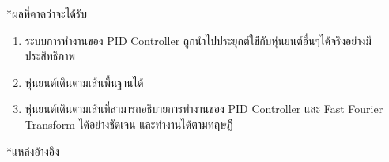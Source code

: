 \documentclass[14pt, fleqn, a4paper]{extarticle}
\makeatletter
\renewcommand\section{%
  \@ifstar{\flatsection}{\@section}%
}
\newcommand{\flatsection}[1]{%
   \par\medskip\noindent
   {\bfseries #1\par}
}
\makeatother
\begin{document}
\section*{ผลที่คาดว่าจะได้รับ} \vspace{-1.25em}
\begin{enumerate}
	\item ระบบการทำงานของ PID Controller ถูกนำไปประยุกต์ใช้่กับหุ่นยนต์อื่นๆได้จริงอย่างมีประสิทธิภาพ
	\item หุ่นยนต์เดินตามเส้นพื้นฐานได้
	\item หุ่นยนต์เดินตามเส้นที่สามารถอธิบายการทำงานของ PID Controller และ Fast Fourier Transform ได้อย่างชัดเจน และทำงานได้ตามทฤษฏี
\end{enumerate}
\vspace{-0.5em}

\section*{แหล่งอ้างอิง} \vspace{-1.25em}
\end{document}
